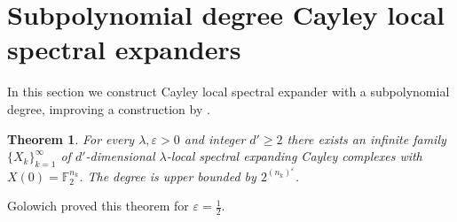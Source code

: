 \documentclass[10pt,a4paper]{article}
\newtheorem{theorem}{Theorem}[section]
\theoremstyle{definition}
\theoremstyle{remark}
\newcommand{\set}[1]{\{#1\}}
\renewcommand{\geq}{\geqslant}
\numberwithin{equation}{section}
\def\S{X}
\def\diml{d}
\def\dimlout{\diml'}
\begin{document}
\section{Subpolynomial degree Cayley local spectral expanders}
\label{sec:construction-subpoly-HDX}
%
In this section we construct Cayley local spectral expander with a subpolynomial degree, improving a construction by \cite{Golowich2023}.

\begin{theorem} \label{thm:main-recursive-hdx}
    For every \(\lambda, \varepsilon > 0\) and integer \(\dimlout \geq 2\) there exists %
    an infinite family \(\set{\S_k}_{k=1}^\infty\) of \(\dimlout\)-dimensional \(\lambda\)-local spectral expanding Cayley complexes with \(\S(0)=\mathbb{F}_2^{n_k}\). The degree is upper bounded by \(2^{ (n_k)^{\varepsilon}}\).
\end{theorem}
Golowich proved this theorem for \(\varepsilon = \frac{1}{2}\).
\end{document}
